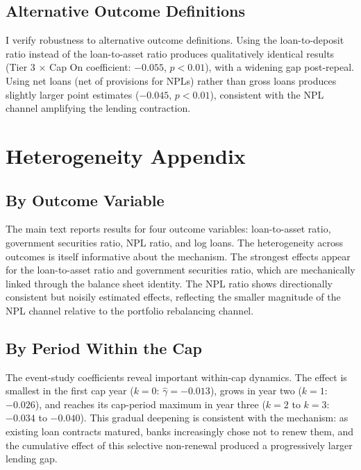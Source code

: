 \documentclass[12pt]{article}
\begin{document}
\subsection{Alternative Outcome Definitions}

I verify robustness to alternative outcome definitions. Using the loan-to-deposit ratio instead of the loan-to-asset ratio produces qualitatively identical results (Tier 3 $\times$ Cap On coefficient: $-0.055$, $p < 0.01$), with a widening gap post-repeal. Using net loans (net of provisions for NPLs) rather than gross loans produces slightly larger point estimates ($-0.045$, $p < 0.01$), consistent with the NPL channel amplifying the lending contraction.


\section{Heterogeneity Appendix}
\label{app:heterogeneity}

\subsection{By Outcome Variable}

The main text reports results for four outcome variables: loan-to-asset ratio, government securities ratio, NPL ratio, and log loans. The heterogeneity across outcomes is itself informative about the mechanism. The strongest effects appear for the loan-to-asset ratio and government securities ratio, which are mechanically linked through the balance sheet identity. The NPL ratio shows directionally consistent but noisily estimated effects, reflecting the smaller magnitude of the NPL channel relative to the portfolio rebalancing channel.

\subsection{By Period Within the Cap}

The event-study coefficients reveal important within-cap dynamics. The effect is smallest in the first cap year ($k = 0$: $\hat{\gamma} = -0.013$), grows in year two ($k = 1$: $-0.026$), and reaches its cap-period maximum in year three ($k = 2$ to $k = 3$: $-0.034$ to $-0.040$). This gradual deepening is consistent with the mechanism: as existing loan contracts matured, banks increasingly chose not to renew them, and the cumulative effect of this selective non-renewal produced a progressively larger lending gap.
\end{document}
